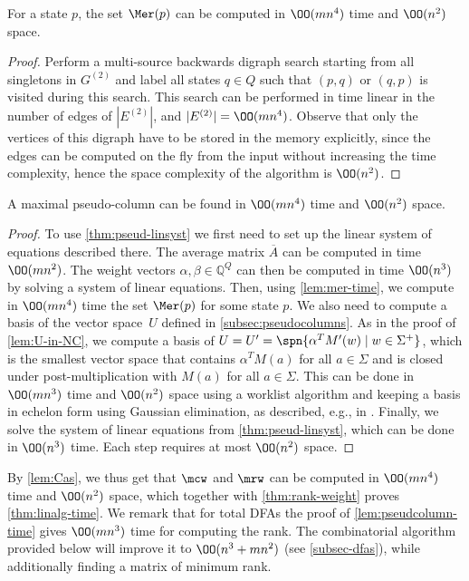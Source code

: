 \begin{lem}\label{lem:mer-time}
    For a state $p$, the set $\Mer(p)$ can be computed in $\OO(mn^4)$ time and $\OO(n^2)$ space.
\end{lem}
\begin{proof}
    Perform a multi-source backwards digraph search starting from all singletons in $G^{(2)}$ and label all states $q \in Q$ such that $(p, q)$ or $(q, p)$ is visited during this search. This search can be performed in time linear in the number of edges of $|E^{(2)}|$, and $|E^{(2)}| = \OO(mn^4)$. 
    Observe that only the vertices of this digraph have to be stored in the memory explicitly, since the edges can be computed on the fly from the input without increasing the time complexity, hence the space complexity of the algorithm is $\OO(n^2)$.
\end{proof}

\begin{lem}\label{lem:pseudcolumn-time}
    A maximal pseudo-column can be found in $\OO(mn^4)$ time and $\OO(n^2)$ space.
\end{lem}
\begin{proof}
To use \autoref{thm:pseud-linsyst} we first need to set up the linear system of equations described there.
The average matrix $\overline{A}$ can be computed in time $\OO(m n^2)$.
The weight vectors $\alpha, \beta \in \mathbb{Q}^Q$ can then be computed in time $\OO(n^3)$ by solving a system of linear equations.
Then, using \autoref{lem:mer-time},
we compute in $\OO(mn^4)$ time the set $\Mer(p)$ for some state $p$.
We also need to compute a basis of the vector space~$U$ defined in \autoref{subsec:pseudocolumns}.
As in the proof of \autoref{lem:U-in-NC}, we compute a basis of $U = U' = \spn{\alpha^T M'(w) \mid w \in \Sigma^+}$, which is the smallest vector space that contains $\alpha^T M(a)$ for all $a \in \Sigma$ and is closed under post-multiplication with $M(a)$ for all $a \in \Sigma$.
This can be done in $\OO(mn^3)$ time and $\OO(n^2)$ space using a worklist algorithm and keeping a basis in echelon form using Gaussian elimination, as described, e.g., in \cite[Section 2]{KieferWeighted20}.
Finally, we solve the system of linear equations from \autoref{thm:pseud-linsyst}, 
which can be done in $\OO(n^3)$ time.
Each step requires at most $\OO(n^2)$ space.
\end{proof}

\noindent
By \autoref{lem:Cas}, we thus get that $\mcw$ and $\mrw$ can be computed in  $\OO(mn^4)$ time and $\OO(n^2)$ space, which together with \autoref{thm:rank-weight} proves \autoref{thm:linalg-time}. 
We remark that for total DFAs the proof of \autoref{lem:pseudcolumn-time} gives $\OO(mn^3)$ time for computing the rank. The combinatorial algorithm provided below will improve it to $\OO(n^3 + mn^2)$ (see \autoref{subsec-dfas}), while additionally finding a matrix of minimum rank.


